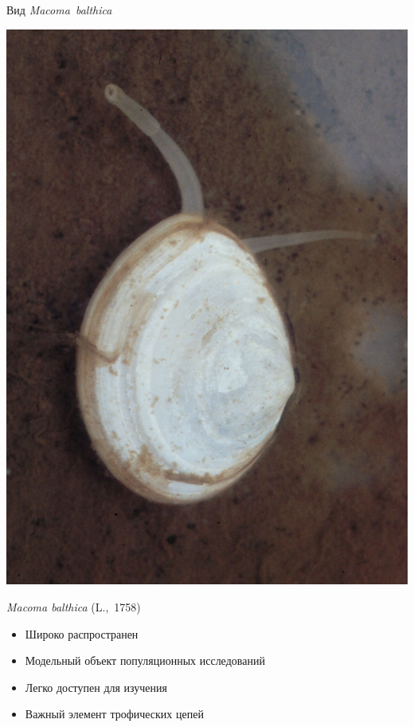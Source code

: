 \documentclass{beamer}
\begin{document}
\begin{frame}{Вид {\it Macoma~balthica}}
	\begin{minipage}[b]{.39\linewidth}
		\begin{center}
			\includegraphics[width=.9\textwidth]{Macoma_balthica.jpg}
		\end{center}
	\end{minipage}
	\begin{minipage}[b]{.49\linewidth}
{\it Macoma balthica} (L.,~1758)
		\begin{itemize}
			\item{Широко распространен}
			\item{Модельный объект популяционных исследований}
			\item{Легко доступен для изучения}
			\item{Важный элемент трофических цепей}
		\end{itemize}
	\end{minipage}
\end{frame}
\end{document}
